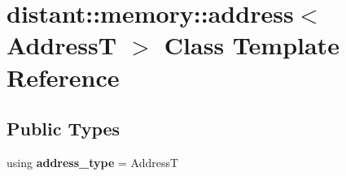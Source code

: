 \hypertarget{classdistant_1_1memory_1_1address}{}\section{distant\+:\+:memory\+:\+:address$<$ AddressT $>$ Class Template Reference}
\label{classdistant_1_1memory_1_1address}
\subsection*{Public Types}
\begin{DoxyCompactItemize}
\item 
\mbox{\label{classdistant_1_1memory_1_1address_ae7e5f3e881710ffeff16d4cc1187e3e5}} 
using {\bfseries address\+\_\+type} = AddressT
\end{DoxyCompactItemize}
